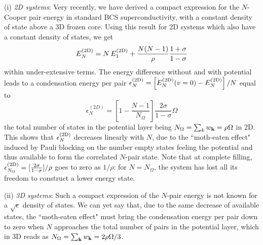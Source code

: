 \documentclass[5p,twocolumn]{elsarticle}
\begin{document}
(i) {\it 2D systems}: Very recently\cite{moth}, we have derived a compact expression for the $N$-Cooper pair energy in standard BCS superconductivity, with a constant density of state above a 3D frozen core. Using this result  for 2D systems which also have a constant density of states, we get
\begin{equation}\label{eq:E2dN}
 E^{{\text{(2D)}}}_N=N\,E^{{\text{(2D)}}}_1+\frac{N(N-1)}{\rho}\frac{1+\sigma}{1-\sigma}
\end{equation}
within under-extensive terms.
The energy difference without and with potential
leads to a condensation energy per pair $\epsilon_N^{{\text{(2D)}}} = \left[E_N^{{{\text{(2D)}}}}(v=0)-E_N^{{\text{(2D)}}}\right]/N$ equal to
  \begin{equation}
\epsilon^{(2D)}_N=\left[1-\frac{N-1}{N_\Omega}\right]\frac{2\sigma}{1-\sigma}\Omega\label{eq:E2D}
\end{equation}
 the total number of states in the potential layer being $N_\Omega=\sum_k{}w_{\mathbf{k}}=\rho\Omega$ in 2D. This shows that $\epsilon^{{\text{(2D)}}}_N$  decreases linearly with $N$, due to the ``moth-eaten effect" induced by Pauli blocking on the number empty states feeling the potential and thus available to form the correlated $N$-pair state.  Note that at complete filling, $
\epsilon^{{\text{(2D)}}}_{N_\Omega}=[\frac{2\sigma}{1-\sigma}]/\rho$ goes to zero as $1/\rho$: for $N=N_\Omega$, the system has lost all its freedom to construct a lower energy state.






(ii) {\it 3D systems}: Such a compact expression of the $N$-pair energy is not known for a $\sqrt{\epsilon}$ density of states. We can yet say that, due to the same decrease of available states, the ``moth-eaten effect" must bring the condensation energy per pair down to zero when $N$ approaches the total number of pairs in the potential layer, which in 3D reads as $N_\Omega=\sum_{\mathbf{k}}w_{\mathbf{k}}=2\rho \Omega/3$. 
\end{document}
